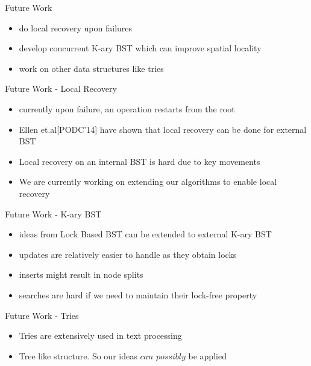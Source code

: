 \begin{frame}{Future Work}
\begin{itemize}
\item do local recovery upon failures
\item develop concurrent K-ary BST which can improve spatial locality
\item work on other data structures like tries
\end{itemize}
\end{frame}

\begin{frame}{Future Work - Local Recovery}
\begin{itemize}
\item currently upon failure, an operation restarts from the root
\item Ellen et.al[PODC'14] have shown that local recovery can be done for external BST
\item Local recovery on an internal BST is hard due to key movements
\item We are currently working on extending our algorithms to enable local recovery
\end{itemize}
\end{frame}

\begin{frame}{Future Work - K-ary BST}
\begin{itemize}
\item ideas from Lock Based BST can be extended to external K-ary BST
\item updates are relatively easier to handle as they obtain locks
\item inserts might result in  node splits
\item searches are hard if we need to maintain their lock-free property
\end{itemize}
\end{frame}

\begin{frame}{Future Work - Tries}
\begin{itemize}
\item Tries are extensively used in text processing
\item Tree like structure. So our ideas $can$ $possibly$ be applied
\end{itemize}
\end{frame}